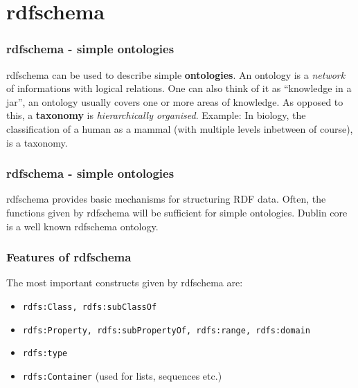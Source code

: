 \documentclass{beamer}
\begin{document}
    \section{rdfschema}

       \begin{frame}
           \frametitle{rdfschema - simple ontologies}

           rdfschema can be used to describe simple \textbf{ontologies}.
           \vskip 0.3cm
           \pause
           An ontology is a \textit{network} of informations with logical relations.
           One can also think of it as ``knowledge in a jar'', an ontology
           usually covers one or more areas of knowledge.
           \vskip 0.3cm
           \pause
           As opposed to this, a \textbf{taxonomy} is \textit{hierarchically organised}.
           Example: In biology, the classification of a human as a mammal (with multiple
           levels inbetween of course), is a taxonomy.
       \end{frame}

       \begin{frame}
           \frametitle{rdfschema - simple ontologies}

           rdfschema provides basic mechanisms for structuring RDF data.
           \vskip 0.3cm
           \pause
           Often, the functions given by rdfschema will be sufficient for simple
           ontologies.
           \vskip 0.3cm
           \pause
           Dublin core is a well known rdfschema ontology.
       \end{frame}

       \begin{frame}
           \frametitle{Features of rdfschema}

           The most important constructs given by rdfschema are:
           \vskip 0.7cm
           \pause
           \begin{itemize}
               \item \texttt{rdfs:Class, rdfs:subClassOf}
               \pause
               \item \texttt{rdfs:Property, rdfs:subPropertyOf, rdfs:range, rdfs:domain}
               \pause
               \item \texttt{rdfs:type}
               \pause
               \item \texttt{rdfs:Container} (used for lists, sequences etc.)
           \end{itemize}
       \end{frame}
\end{document}
